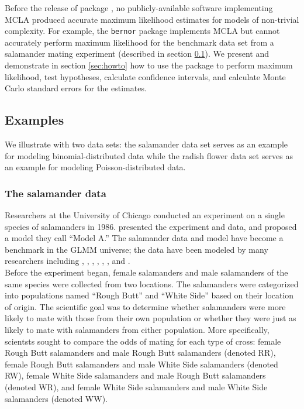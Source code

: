 \documentclass[article]{jss}
\begin{document}
Before the release of  package , no publicly-available software  implementing MCLA  produced accurate maximum likelihood estimates for models of non-trivial complexity. For example, the \texttt{bernor}  package \citep{sung:geyer:2007} implements MCLA but cannot accurately perform maximum likelihood for the benchmark data set from a salamander mating experiment (described in section \ref{sec:examples}). 
We present     and demonstrate in section \ref{sec:howto} how to use the package to perform maximum likelihood, test hypotheses, calculate confidence intervals, and calculate Monte Carlo standard errors for the estimates.  


\subsection{Examples}\label{sec:examples}
We  illustrate  with two data sets: the salamander data set serves as an example for modeling binomial-distributed data while the radish flower data set serves as an example for modeling Poisson-distributed data.

\subsubsection{The salamander data}

Researchers at the University of Chicago conducted an experiment on a single species of salamanders  in 1986.
 \citet[Section 14.5]{mcc:nelder:1989} presented the experiment and data, and \citet{karim:zeger:1992} proposed a model they call ``Model A.'' The salamander data and model have become a benchmark in the GLMM universe;  the data have been modeled by many researchers including \citet{booth:hobert:1999},  \citet{bres:clay:1993},   \citet{karim:zeger:1992}, \citet{mcc:nelder:1989},  \citet{schall:1991},  \citet{sung:geyer:2007}, and \citet{wolfinger:oconnell:1993}.\\




Before the experiment began, female salamanders and male salamanders of the same species were collected from two locations. The salamanders were categorized into populations named ``Rough Butt'' and ``White Side'' based on their location of origin. The scientific goal was to determine whether salamanders were more likely to mate with those from their own population or whether they were just as likely to mate with salamanders from either population. More specifically, scientsts sought to compare the odds of mating for each type of  cross: female Rough Butt salamanders and male Rough Butt salamanders (denoted RR), female Rough Butt salamanders and male White Side salamanders (denoted RW), female White Side salamanders and male Rough Butt salamanders (denoted WR), and female White Side salamanders and male White Side salamanders (denoted WW).    \\
\end{document}
